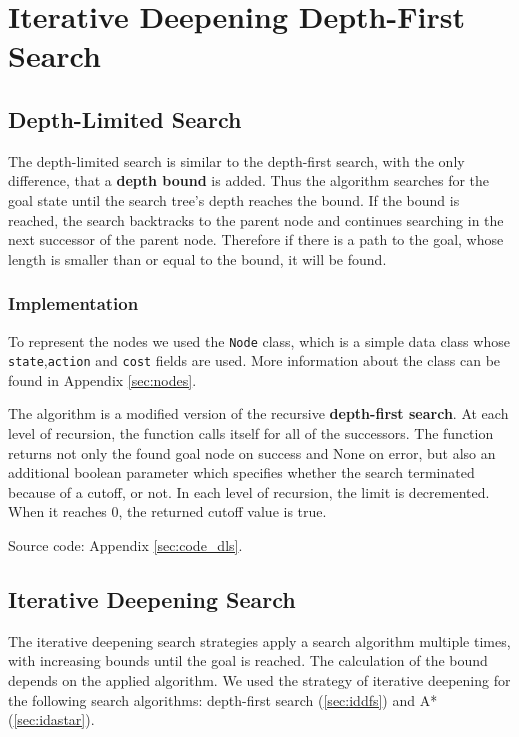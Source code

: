 \section{Iterative Deepening Depth-First Search} 

\subsection{Depth-Limited Search}
\label{sec:dls}

The depth-limited search is similar to the depth-first search, with the only difference, that a \textbf{depth bound} is added. Thus the algorithm searches for the goal state until the search tree's depth reaches the bound. If the bound is reached, the search backtracks to the parent node and continues searching in the next successor of the parent node. Therefore if there is a path to the goal, whose length is smaller than or equal to the bound, it will be found.

\subsubsection{Implementation}

To represent the nodes we used the \verb|Node| class, which is a simple data class whose \verb|state|,\verb|action| and \verb|cost| fields are used. More information about the class can be found in Appendix \ref{sec:nodes}.

The algorithm is a modified version of the recursive \textbf{depth-first search}. At each level of recursion, the function calls itself for all of the successors. The function returns not only the found goal node on success and None on error, but also an additional boolean parameter which specifies whether the search terminated because of a cutoff, or not. In each level of recursion, the limit is decremented. When it reaches 0, the returned cutoff value is true.

Source code: Appendix \ref{sec:code_dls}.


\subsection{Iterative Deepening Search}

The iterative deepening search strategies apply a search algorithm multiple times, with increasing bounds until the goal is reached. The calculation of the bound depends on the applied algorithm. We used the strategy of iterative deepening for the following search algorithms: depth-first search (\ref{sec:iddfs}) and A* (\ref{sec:idastar}).


